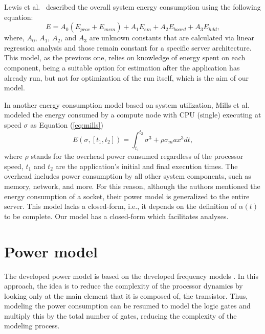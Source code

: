 Lewis et al.~\cite{Lewis2008Run-timeSystems} described the overall system energy consumption using the following equation:
\begin{equation}
E = A_0(E_{proc} + E_{mem}) + A_1E_{em} + A_2E_{board} + A_3E_{hdd},
\label{eq:lewvis}
\end{equation}
where, $A_0$, $A_1$, $A_2$, and $A_3$ are unknown constants that are calculated via linear regression analysis and those remain constant for a specific server architecture. This model, as the previous one, relies on knowledge of energy spent on each component, being  a suitable option for estimation after the application has already run, but not for optimization of the run itself, which is the aim of our model.

In another energy consumption model  based on system utilization, Mills et al. \cite{Mills2014EnergySystems} modeled the energy consumed by a compute node with CPU (single) executing at speed $\sigma$ as Equation (\ref{eq:mills})%
\begin{equation}
E(\sigma,[t_1,t_2]) = \int_{t_1}^{t_2} \sigma^3 + \rho \sigma_max^3 dt,
\label{eq:mills}
\end{equation}
where $\rho$ stands for the overhead power consumed regardless of the processor speed, $t_1$ and $t_2$ are the application's initial and final execution times. The overhead includes power consumption by all other system components, such as memory, network, and more. For this reason, although the authors mentioned the energy consumption of a socket, their power model is generalized to the entire server. This model lacks a closed-form, i.e., it depends on the definition of $\alpha(t)$ to be complete. Our model has a closed-form which facilitates analyses.

\section{Power model} \label{sec:power_model}

The developed power model is based on the developed frequency models \cite{Rauber2014EnergyScaling, Goel2016AProcessors, Du2017ModelingSystems, Gonzalez1997SupplyCMOS}. In this approach, the idea is to reduce the complexity of the processor dynamics by looking only at the main element that it is composed of, the transistor. Thus, modeling the power consumption can be resumed to model the logic gates and multiply this by the total number of gates, reducing the complexity of the modeling process.

